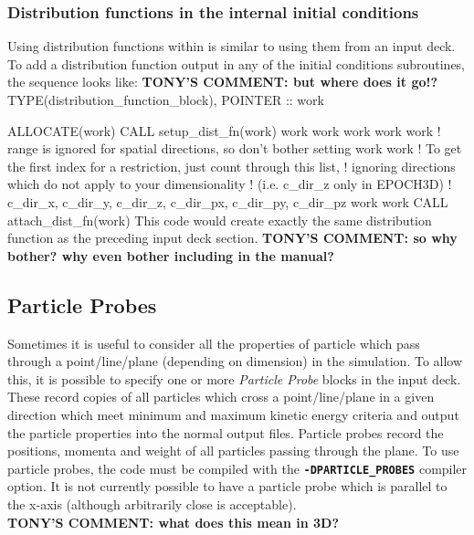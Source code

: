 \documentclass[12pt,a4paper]{article}
\newcommand{\inlinecode}[1]{{\color{warwickred} \bf\texttt{#1}}}
\newcommand{\EPOCH}{{\color{warwickdark}\fontfamily{phv}\selectfont{EPOCH}}}
\newcommand{\tony}[1]{{\color{warwickred} \bf{TONY'S COMMENT:} \bf{#1}}\\}
\newenvironment{boxverbatim}{\lboxverbatim{none}}{\endlboxverbatim}
\begin{document}
\subsubsection{Distribution functions in the internal initial conditions}
Using distribution functions within {\EPOCH} is similar to using them from an
input deck. To add a distribution function output in any of the initial
conditions subroutines, the sequence looks like:
\tony{but where does it go!?}
\begin{boxverbatim}
  TYPE(distribution_function_block), POINTER :: work

  ALLOCATE(work)
  CALL setup_dist_fn(work)
  work%
  work%
  work%
  work%
  work%
  ! range is ignored for spatial directions, so don't bother setting
  work%
  work%
  ! To get the first index for a restriction, just count through this list,
  ! ignoring directions which do not apply to your dimensionality
  ! (i.e. c_dir_z only in EPOCH3D)
  ! c_dir_x, c_dir_y, c_dir_z, c_dir_px, c_dir_py, c_dir_pz
  work%
  work%
  CALL attach_dist_fn(work)
\end{boxverbatim}
This code would create exactly the same distribution function as the
preceding input deck section. \tony{so why bother? why even bother
including in the manual?}

\subsection{Particle Probes}
Sometimes it is useful to consider all the properties of particle which pass
through a point/line/plane (depending on dimension) in the simulation. To
allow this, it is possible to specify one or more {\it Particle Probe} blocks
in the input deck. These record copies of all particles which cross a
point/line/plane in a given direction which meet minimum and maximum kinetic
energy criteria and output the particle properties into the normal output
files. Particle probes record the positions, momenta and weight of all
particles passing through the plane. To use particle probes, the code must be
compiled with the \inlinecode{-DPARTICLE\_PROBES} compiler option. It is not
currently possible to have a particle probe which is parallel to the x-axis
(although arbitrarily close is acceptable). \\
\tony{what does this mean in 3D?}
\end{document}
